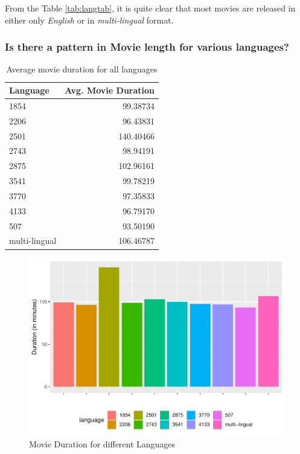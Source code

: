 \documentclass[11pt,a4paper,]{article}
\begin{document}
From the Table \ref{tab:langtab}, it is quite clear that most movies are released in either only \emph{English} or in \emph{multi-lingual} format.

\hypertarget{is-there-a-pattern-in-movie-length-for-various-languages}{%
\subsubsection{Is there a pattern in Movie length for various languages?}\label{is-there-a-pattern-in-movie-length-for-various-languages}}

\begin{table}[!h]

\caption{\label{tab:langtab2}Average movie duration for all languages}
\centering
\begin{tabular}[t]{l|r}
\hline
Language & Avg. Movie Duration\\
\hline
\rowcolor{gray!6}  1854 & 99.38734\\
\hline
2206 & 96.43831\\
\hline
\rowcolor{gray!6}  2501 & 140.40466\\
\hline
2743 & 98.94191\\
\hline
\rowcolor{gray!6}  2875 & 102.96161\\
\hline
3541 & 99.78219\\
\hline
\rowcolor{gray!6}  3770 & 97.35833\\
\hline
4133 & 96.79170\\
\hline
\rowcolor{gray!6}  507 & 93.50190\\
\hline
multi-lingual & 106.46787\\
\hline
\end{tabular}
\end{table}

\begin{figure}[H]

{\centering \includegraphics{Report_files/figure-latex/langfig-1} 

}

\caption{Movie Duration for different Languages}\label{fig:langfig}
\end{figure}
\end{document}

